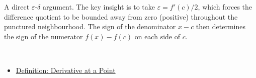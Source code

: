 \begin{remark*}
A direct $\varepsilon$-$\delta$ argument. The key insight is to take $\varepsilon = f'(c)/2$, which forces the difference quotient to be bounded away from zero (positive) throughout the punctured neighbourhood. The sign of the denominator $x - c$ then determines the sign of the numerator $f(x) - f(c)$ on each side of $c$.
\end{remark*}

\begin{remark*}[Dependencies]~\\
\begin{itemize}
  \item \hyperref[def:derivative-at-a-point]{Definition: Derivative at a Point}
\end{itemize}
\end{remark*}

\clearpage
